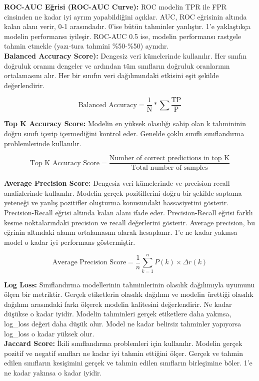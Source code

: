 \textbf{ROC-AUC Eğrisi (ROC-AUC Curve):} ROC modelin TPR ile FPR cinsinden ne kadar iyi ayrım yapabildiğini açıklar. AUC, ROC eğrisinin altında kalan alanı verir, 0-1 arasındadır. 0'ise bütün tahminler yanlıştır. 1'e yaklaştıkça modelin performansı iyileşir. ROC-AUC 0.5 ise, modelin performansı rastgele tahmin etmekle (yazı-tura tahmini \%50-\%50) aynıdır. \\

\textbf{Balanced Accuracy Score):} Dengesiz veri kümelerinde kullanılır. Her sınıfın doğruluk oranını dengeler ve ardından tüm sınıfların doğruluk oranlarının ortalamasını alır. Her bir sınıfın veri dağılımındaki etkisini eşit şekilde değerlendirir.

\[\text{Balanced Accuracy} = \frac{1}{\text{N}} * \sum{\frac{\text{TP}}{\text{P}}}\]

\textbf{Top K Accuracy Score:} Modelin en yüksek olasılığı sahip olan k tahmininin doğru sınıfı içerip içermediğini kontrol eder. Genelde çoklu sınıflı sınıflandırma problemlerinde kullanılır.

\[\text{Top K Accuracy Score} = \frac{\text{Number of correct predictions in top K}}{\text{Total number of samples}}\]

\textbf{Average Precision Score:} Dengesiz veri kümelerinde ve precision-recall analizlerinde kullanılır. Modelin gerçek pozitiflerini doğru bir şekilde saptama yeteneği ve yanlış pozitifler oluşturma konusundaki hassasiyetini gösterir. Precision-Recall eğrisi altında kalan alanı ifade eder. Precision-Recall eğrisi farklı kesme noktalarındaki precision ve recall değerlerini gösterir. Average precision, bu eğrinin altındaki alanın ortalamasını alarak hesaplanır. 1'e ne kadar yakınsa model o kadar iyi performans göstermiştir.

\[\text{Average Precision Score} = \frac{1}{n} \sum_{k=1}^{n} P(k) \times \Delta r(k)\]

\textbf{Log Loss:} Sınıflandırma modellerinin tahminlerinin olasılık dağılımıyla uyumunu ölçen bir metriktir. Gerçek etiketlerin olasılık dağılımı ve modelin ürettiği olasılık dağılımı arasındaki farkı ölçerek modelin kalitesini değerlendirir. Ne kadar düşükse o kadar iyidir. Modelin tahminleri gerçek etiketlere daha yakınsa, log\_loss değeri daha düşük olur. Model ne kadar belirsiz tahminler yapıyorsa log\_loss o kadar yüksek olur.\\

\textbf{Jaccard Score:} İkili sınıflandırma problemleri için kullanılır. Modelin gerçek pozitif ve negatif sınıfları ne kadar iyi tahmin ettiğini ölçer. Gerçek ve tahmin edilen sınıfların kesişimini gerçek ve tahmin edilen sınıfların birleşimine böler. 1'e ne kadar yakınsa o kadar iyidir.

